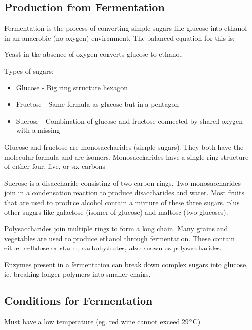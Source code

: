 	\subsection{Production from Fermentation}
	
		Fermentation is the process of converting simple sugars like glucose into ethanol in an anaerobic (no oxygen) environment. The balanced equation for this is:

		\begin{center}
		\end{center}

		Yeast in the absence of oxygen converts glucose to ethanol.

		Types of sugars:
		\begin{itemize}
			\item Glucose - Big ring structure hexagon
			\item Fructose - Same formula as glucose but in a pentagon
			\item Sucrose - Combination of glucose and fructose connected by shared oxygen with a missing 
		\end{itemize}

		Glucose and fructose are monosaccharides (simple sugars). They both have the molecular formula  and are isomers. Monosaccharides have a single ring structure of either four, five, or six carbons

		Sucrose is a disaccharide consisting of two carbon rings. Two monosaccharides join in a condensation reaction to produce disaccharides and water. Most fruits that are used to produce alcohol contain a mixture of these three sugars. plus other sugars like galactose (isomer of glucose) and maltose (two glucoses).

		Polysaccharides join multiple rings to form a long chain. Many grains and vegetables are used to produce ethanol through fermentation. These contain either cellulose or starch, carbohydrates, also known as polysaccharides.

		Enzymes present in a fermentation can break down complex sugars into glucose, ie. breaking longer polymers into smaller chains.

	\subsection{Conditions for Fermentation}
	
		Must have a low temperature (eg. red wine cannot exceed 29$\degree$C)

